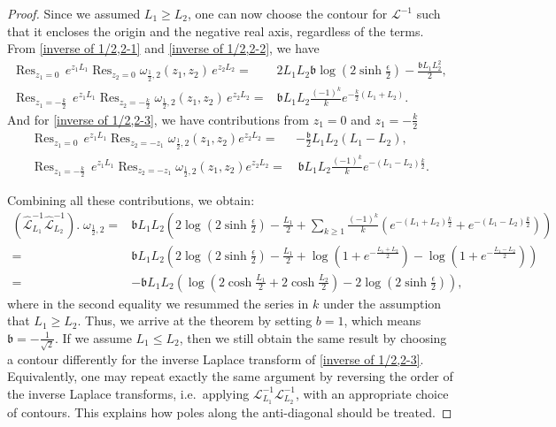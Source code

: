 \documentclass[12pt]{amsart}
\DeclareMathOperator*{\Res}{Res}
\theoremstyle{plain}
\theoremstyle{definition}
\theoremstyle{remark}
\numberwithin{equation}{section}
\begin{document}
\begin{proof}
Since we assumed $L_1\geq L_2$, one can now choose the contour for $\mathcal{L}^{-1}$ such that it encloses the origin and the negative real axis, regardless of the terms. From \eqref{inverse of 1/2,2-1} and \eqref{inverse of 1/2,2-2}, we have
\begin{align}
\Res_{z_1=0} \,e^{z_1L_1}\Res_{z_2=0}\omega_{\frac12,2}(z_1,z_2)\,e^{z_2L_2}=&2L_1L_2\mathfrak{b}\log\left(2\sinh\frac{\epsilon}{2}\right)-\frac{\mathfrak{b}L_1L_2^2}{2},\label{inverse of 1/2,2-4}\\
      \Res_{z_1=-\frac{k}{2}} \,e^{z_1L_1} \Res_{z_2=-\frac{k}{2}}\omega_{\frac12,2}(z_1,z_2)\,e^{z_2L_2}=&\mathfrak{b}L_1L_2\frac{(-1)^k}{k}e^{-\frac{k}{2}(L_1+L_2)}.\label{inverse of 1/2,2-5}
\end{align}
And for \eqref{inverse of 1/2,2-3}, we have contributions from $z_1=0$ and $z_1=-\frac{k}{2}$
    \begin{align*}
        \Res_{z_1=0}\,e^{z_1L_1} \Res_{z_2=-z_1}\omega_{\frac12,2}(z_1,z_2)e^{z_2L_2}=&-\frac{\mathfrak{b}}{2}L_1L_2(L_1-L_2),\\
        \Res_{z_1=-\frac{k}{2}}\,e^{z_1L_1} \Res_{z_2=-z_1}\omega_{\frac12,2}(z_1,z_2)e^{z_2L_2}=&\,\mathfrak{b}L_1L_2\frac{(-1)^k}{k}e^{-(L_1-L_2)\frac{k}{2}}.
    \end{align*}

Combining all these contributions, we obtain:
\begin{align*}
    (\hat{\mathcal{L}}_{L_1}^{-1} \hat{\mathcal{L}}_{L_2}^{-1}).\;\omega_{\frac12,2}=&\mathfrak{b}L_1L_2\left(2\log\left(2\sinh\frac{\epsilon}{2}\right)-\frac{L_1}{2}+\sum_{k\geq1}\frac{(-1)^k}{k}\left(e^{-(L_1+L_2)\frac{k}{2}}+e^{-(L_1-L_2)\frac{k}{2}}\right)\right)\nonumber\\
    =&\mathfrak{b}L_1L_2\left(2\log\left(2\sinh\frac{\epsilon}{2}\right)-\frac{L_1}{2}+\log\left(1+e^{-\frac{L_1+L_2}{2}}\right)-\log\left(1+e^{-\frac{L_1-L_2}{2}}\right)\right)\nonumber\\
    =&-\mathfrak{b}L_1L_2\left(\log\left(2\cosh\frac{L_1}{2}+2\cosh\frac{L_2}{2}\right)-2\log\left(2\sinh\frac{\epsilon}{2}\right)\right),
\end{align*}
where in the second equality we resummed the series in $k$ under the assumption that $L_1\geq L_2$. Thus, we arrive at the theorem by setting $b=1$, which means $\mathfrak{b}=-\frac{1}{\sqrt{2}}$. If we assume $L_1\leq L_2$, then we still obtain the same result by choosing a contour differently for the inverse Laplace transform of \eqref{inverse of 1/2,2-3}. Equivalently, one may repeat exactly the same argument by reversing the order of the inverse Laplace transforms, i.e.~applying $\mathcal{L}^{-1}_{L_1}\mathcal{L}^{-1}_{L_2}$, with an appropriate choice of contours. This explains how poles along the anti-diagonal should be treated.
\end{proof}
\end{document}
